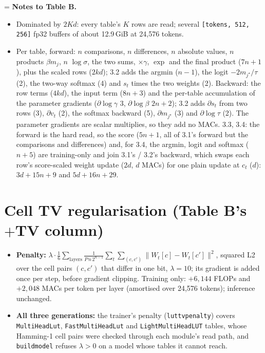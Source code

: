 \documentclass[10pt]{article}
\newcommand{\code}[1]{{\renewcommand{\_}{\textunderscore\allowbreak}\texttt{#1}}}
\newcommand{\note}[1]{\textsuperscript{\textbf{#1}}}
\begin{document}
\normalsize
\begingroup\makeatletter\@beginparpenalty=\@M\makeatother%
\noindent\textbf{Notes to Table B.}\par\nopagebreak
\begin{itemize}\setlength\itemsep{0pt}\footnotesize
\item[\note{a}] Dominated by $2Kd$: every table's $K$ rows are read; several \code{[tokens, 512, 256]} fp32 buffers of about 12.9\,GiB at 24,576 tokens.
\item[\note{b}] Per table, forward: $n$ comparisons, $n$ differences, $n$ absolute values, $n$ products $\beta m_j$, $n$ $\log\sigma$, the two sums, $\times\gamma$, $\exp$ and the final product ($7n+1$), plus the scaled rows ($2kd$);
  3.2 adds the argmin ($n-1$), the logit $-2m_{j^\star}/\tau$ (2), the two-way softmax (4) and $s_t$ times the two weights (2).
  Backward: the row terms ($4kd$), the input term ($8n+3$) and the per-table accumulation of the parameter gradients ($\partial\log\gamma$ 3, $\partial\log\beta$ $2n+2$);
  3.2 adds $\partial s_t$ from two rows (3), $\partial v_t$ (2), the softmax backward (5), $\partial m_{j^\star}$ (3) and $\partial\log\tau$ (2).
  The parameter gradients are scalar multiplies, so they add no MACs.
  3.3, 3.4: the forward is the hard read, so the score ($5n+1$, all of 3.1's forward but the comparisons and differences) and, for 3.4, the argmin, logit and softmax ($n+5$) are training-only and join 3.1's / 3.2's backward,
  which swaps each row's score-scaled weight update ($2d$, $d$ MACs) for one plain update at $c_t$ ($d$): $3d+15n+9$ and $5d+16n+29$.
\end{itemize}
\endgroup

\section*{Cell TV regularisation (Table B's $+$TV column)}
\begin{itemize}\setlength\itemsep{1pt}
\item \textbf{Penalty:} $\lambda\cdot\frac16\sum_{\text{layers}}\frac{1}{P\,n\,2^{n-1}}\sum_t\sum_{(c,c')}\|W_t[c]-W_t[c']\|^2$, squared L2 over the cell pairs $(c,c')$ that differ in one bit, $\lambda=10$; its gradient is added once per step, before gradient clipping.
  Training only: $+6{,}144$ FLOPs and $+2{,}048$ MACs per token per layer (amortised over 24,576 tokens); inference unchanged.
\item \textbf{All three generations:} the trainer's penalty (\code{lut\_tv\_penalty}) covers \code{MultiHeadLut}, \code{FastMultiHeadLut} and \code{LightMultiHeadLUT} tables, whose Hamming-1 cell pairs were checked through each module's read path,
  and \code{build\_model} refuses $\lambda>0$ on a model whose tables it cannot reach.
\end{itemize}
\end{document}
